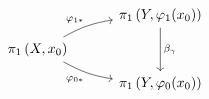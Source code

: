 \documentclass{article}
\begin{document}
    \begin{equation*}
        \begin{tikzcd}[column sep = 1cm, row sep=0.25cm]
            & \pi_1\l(Y,\phi_1\!\l(x_0\r)\r) \ar[dd, "\beta_\gamma"] \\
            \pi_1\l(X,x_0\r) \ar[ur, "\phi_{1\ast}", bend left=10] \ar[dr, "\phi_{0\ast}"', bend right=10] \\
            & \pi_1\l(Y,\phi_0\!\l(x_0\r)\r)
        \end{tikzcd}
    \end{equation*}
\end{document}
